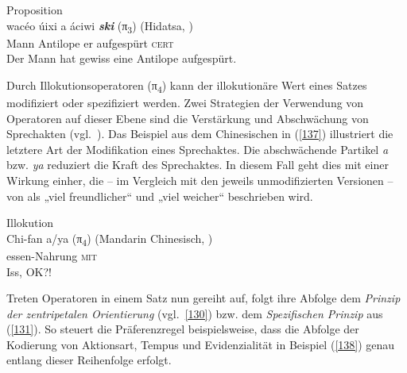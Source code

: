 \begin{exe}
	\ex\label{136}
	Proposition\\
	\gll wac\'{e}o \'{u}ixi        a   \'{a}ciwi         \textbf{\textit{ski}} (π\textsubscript{3}) (Hidatsa, \citealt{Matthews1964})\\
	Mann Antilope er aufgespürt \textsc{cert}\\
	\glt Der Mann hat gewiss eine Antilope aufgespürt.	
\hfill\hbox{\citet[139]{Hengeveld1989}}	
\end{exe}
Durch Illokutionsoperatoren (π\textsubscript{4})  kann der illokutionäre Wert eines Satzes modifiziert oder spezifiziert werden. Zwei Strategien der Verwendung von Operatoren auf dieser Ebene sind die Verstärkung und Abschwächung von Sprechakten (vgl.\ \citealt[140--141]{Hengeveld1989}). Das Beispiel aus dem Chinesischen in (\ref{137}) illustriert die letztere Art der Modifikation eines Sprechaktes. Die abschwächende Partikel \textit{a} bzw. \textit{ya} reduziert die Kraft des Sprechaktes. In diesem Fall geht dies mit einer Wirkung einher, die – im Vergleich mit den jeweils unmodifizierten Versionen – von \citet[140]{Hengeveld1989} als „viel freundlicher“ und „viel weicher“ beschrieben wird. 

\begin{exe}
	\ex\label{137}
	Illokution\\
	\gll Chi-fan          a/ya (π\textsubscript{4}) (Mandarin Chinesisch, \citealt{Li1981})\\
	essen-Nahrung \textsc{mit}\\
	\glt Iss, OK?!	
\hfill\hbox{\citet[140--141]{Hengeveld1989}}	
\end{exe}
Treten Operatoren in einem Satz nun gereiht auf, folgt ihre Abfolge dem \textit{Prinzip der zentripetalen Orientierung} (vgl.\ \ref{130})  bzw. dem \textit{Spezifischen Prinzip} aus (\ref{131}). So steuert die Präferenzregel beispielsweise, dass die Abfolge der Kodierung von Aktionsart, Tempus und Evidenzialität in Beispiel (\ref{138}) genau entlang dieser Reihenfolge erfolgt.
	
